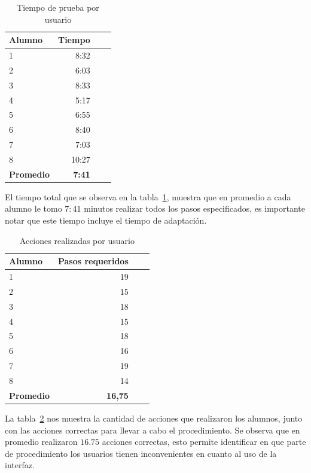 \begin{table}[!hbt]
\centering
\begin{tabular}{lrrr}
\toprule
\textbf{Alumno} & \textbf{Tiempo} \\
\midrule
1        & 8:32 \\
2        & 6:03 \\
3        & 8:33 \\
4        & 5:17 \\
5        & 6:55 \\
6        & 8:40 \\
7        & 7:03 \\
8        & 10:27 \\
\midrule
\textbf{Promedio} & \textbf{7:41} \\
\bottomrule
\end{tabular}
\caption{Tiempo de prueba por usuario}
\label{tab:interfaz_tiempo_total}
\end{table}

El tiempo total que se observa en la tabla~\ref{tab:interfaz_tiempo_total},
muestra que en promedio a cada alumno le tomo $7:41$ minutos realizar todos los
pasos especificados, es importante notar que este tiempo incluye el tiempo de
adaptación. 



\begin{table}[!hbt]
\centering
\begin{tabular}{lrrr}
\toprule
\textbf{Alumno} & \textbf{Pasos requeridos} \\
\midrule
1 & 19 \\
2 & 15 \\
3 & 18 \\
4 & 15 \\
5 & 18 \\
6 & 16 \\
7 & 19 \\
8 & 14 \\
\midrule
\textbf{Promedio} & \textbf{16,75} \\
\bottomrule
\end{tabular}
\caption{Acciones realizadas por usuario}
\label{tab:interfaz_acciones}
\end{table}

La tabla~\ref{tab:interfaz_acciones} nos muestra la cantidad de acciones que
realizaron los alumnos, junto con las acciones correctas para llevar a cabo el
procedimiento. Se observa que en promedio realizaron $16.75$ acciones correctas,
esto permite identificar en que parte de procedimiento los usuarios tienen
inconvenientes en cuanto al uso de la interfaz.

